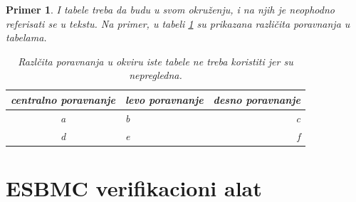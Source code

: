 \documentclass[a4paper]{article}
\newtheorem{primer}{Primer}[section]
\begin{document}
	\begin{primer} I tabele treba da budu u svom okruženju, i na njih je neophodno referisati se u tekstu. Na primer, u tabeli \ref{tab:tabela1} su prikazana različita poravnanja u tabelama.

	\begin{table}[h!]
	\begin{center}
	\caption{Razlčita poravnanja u okviru iste tabele ne treba koristiti jer su nepregledna.}
	\begin{tabular}{|c|l|r|} \hline
	centralno poravnanje& levo poravnanje& desno poravnanje\\ \hline
	a &b&c\\ \hline
	d &e&f\\ \hline
	\end{tabular}
	\label{tab:tabela1}
	\end{center}
	\end{table}

	\end{primer}





	\section{ESBMC verifikacioni alat}
	\label{sec:ESBMC}
\end{document}

